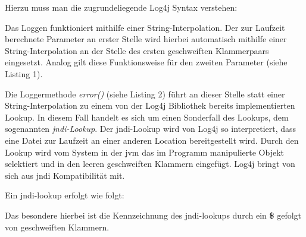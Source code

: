 Hierzu muss man die zugrundeliegende Log4j Syntax verstehen:

\bigskip

Das Loggen funktioniert mithilfe einer String-Interpolation. Der zur Laufzeit berechnete Parameter an erster Stelle wird hierbei automatisch
mithilfe einer String-Interpolation an der Stelle des ersten geschweiften Klammerpaars eingesetzt. Analog gilt diese Funktionsweise für den zweiten Parameter (siehe Listing 1).

Die Loggermethode \textit{error()} (siehe Listing 2) führt an dieser Stelle statt einer String-Interpolation zu einem von der Log4j Bibliothek bereits implementierten Lookup.
In diesem Fall handelt es sich um einen Sonderfall des Lookups, dem sogenannten \textit{\gls{jndi}-Lookup}. Der \gls{jndi}-Lookup wird von Log4j so interpretiert, dass eine Datei zur Laufzeit
an einer anderen Location bereitgestellt wird.
Durch den Lookup wird vom System in der \gls{jvm} das im Programm manipulierte Objekt selektiert und in den leeren geschweiften Klammern eingefügt.
Log4j bringt von sich aus \gls{jndi} Kompatibilität mit.

\newpage

Ein \gls{jndi}-lookup erfolgt wie folgt:

\bigskip

Das besondere hierbei ist die Kennzeichnung des \gls{jndi}-lookups durch ein \textbf{\$} gefolgt von geschweiften Klammern.